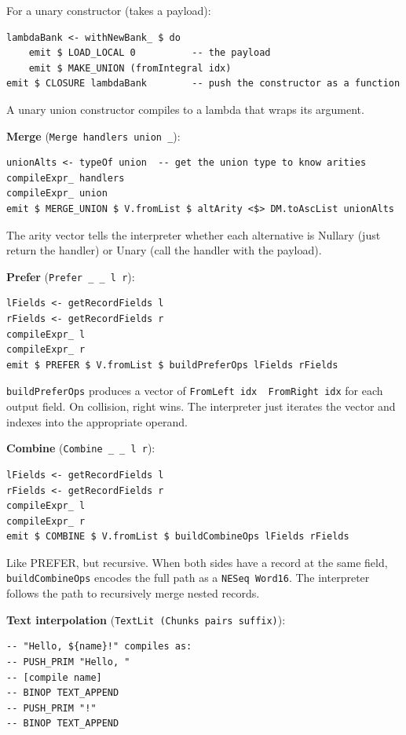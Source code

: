 \documentclass[]{article}
\begin{document}
For a unary constructor (takes a payload):

\begin{verbatim}
lambdaBank <- withNewBank_ $ do
    emit $ LOAD_LOCAL 0          -- the payload
    emit $ MAKE_UNION (fromIntegral idx)
emit $ CLOSURE lambdaBank        -- push the constructor as a function
\end{verbatim}

A unary union constructor compiles to a lambda that wraps its argument.

\textbf{Merge} (\texttt{Merge\ handlers\ union\ \_}):

\begin{verbatim}
unionAlts <- typeOf union  -- get the union type to know arities
compileExpr_ handlers
compileExpr_ union
emit $ MERGE_UNION $ V.fromList $ altArity <$> DM.toAscList unionAlts
\end{verbatim}

The arity vector tells the interpreter whether each alternative is Nullary (just
return the handler) or Unary (call the handler with the payload).

\textbf{Prefer} (\texttt{Prefer\ \_\ \_\ l\ r}):

\begin{verbatim}
lFields <- getRecordFields l
rFields <- getRecordFields r
compileExpr_ l
compileExpr_ r
emit $ PREFER $ V.fromList $ buildPreferOps lFields rFields
\end{verbatim}

\texttt{buildPreferOps} produces a vector of
\texttt{FromLeft\ idx\ \textbar{}\ FromRight\ idx} for each output field. On
collision, right wins. The interpreter just iterates the vector and indexes into
the appropriate operand.

\textbf{Combine} (\texttt{Combine\ \_\ \_\ l\ r}):

\begin{verbatim}
lFields <- getRecordFields l
rFields <- getRecordFields r
compileExpr_ l
compileExpr_ r
emit $ COMBINE $ V.fromList $ buildCombineOps lFields rFields
\end{verbatim}

Like PREFER, but recursive. When both sides have a record at the same field,
\texttt{buildCombineOps} encodes the full path as a \texttt{NESeq\ Word16}. The
interpreter follows the path to recursively merge nested records.

\textbf{Text interpolation} (\texttt{TextLit\ (Chunks\ pairs\ suffix)}):

\begin{verbatim}
-- "Hello, ${name}!" compiles as:
-- PUSH_PRIM "Hello, "
-- [compile name]
-- BINOP TEXT_APPEND
-- PUSH_PRIM "!"
-- BINOP TEXT_APPEND
\end{verbatim}
\end{document}
